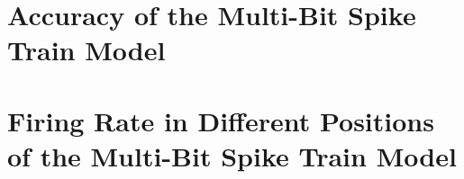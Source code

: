\chapter{Accuracy of the Multi-Bit Spike Train Model}
\label{appendix:accuracy}

\chapter{Firing Rate in Different Positions of the Multi-Bit Spike Train Model}
\label{appendix:firerate}